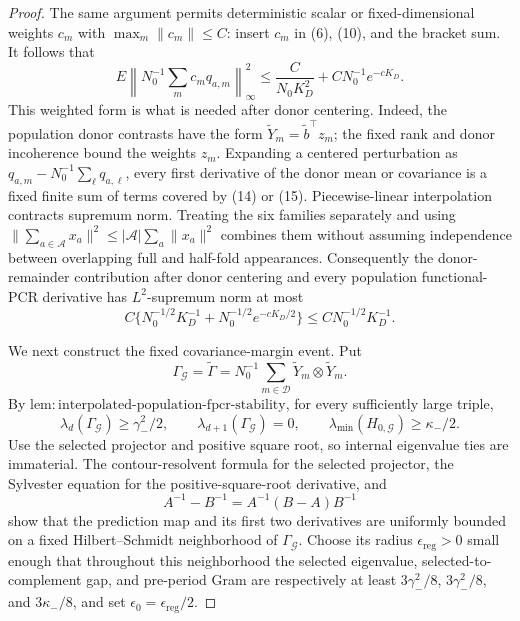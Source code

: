 \documentclass{article}
\begin{document}
\begin{proof}
The same argument permits deterministic scalar or fixed-dimensional weights
\(c_m\) with \(\max_m\|c_m\|\leq C\): insert \(c_m\) in (6), (10), and
the bracket sum.  It follows that
\[
 E\left\|N_0^{-1}\sum_m c_mq_{a,m}\right\|_\infty^2
 \leq\frac{C}{N_0K_D^2}+C N_0^{-1}e^{-cK_D}.           \tag{15}
\]
This weighted form is what is needed after donor centering.  Indeed, the
population donor contrasts have the form
\(\widetilde Y_m=\widetilde b^{\top}z_m\); the fixed rank and donor
incoherence bound the weights \(z_m\).  Expanding a centered perturbation as
\(q_{a,m}-N_0^{-1}\sum_\ell q_{a,\ell}\), every first derivative of the
donor mean or covariance is a fixed finite sum of terms covered by (14) or
(15).  Piecewise-linear interpolation contracts supremum norm.  Treating the
six families separately and using
\(\|\sum_{a\in\mathscr A}x_a\|^2\leq
|\mathscr A|\sum_a\|x_a\|^2\) combines them without assuming independence
between overlapping full and half-fold appearances.  Consequently the
donor-remainder contribution after donor centering and every population
functional-PCR derivative has \(L^2\)-supremum norm at most
\[
 C\{N_0^{-1/2}K_D^{-1}+N_0^{-1/2}e^{-cK_D/2}\}
 \leq C N_0^{-1/2}K_D^{-1}.                            \tag{16}
\]

We next construct the fixed covariance-margin event.  Put
\[
 \Gamma_{\mathcal G}=\widetilde\Gamma
 =N_0^{-1}\sum_{m\in\mathcal D}
   \widetilde Y_m\otimes\widetilde Y_m.
\]
By
\(\mathrm{lem:interpolated\mbox{-}population\mbox{-}fpcr\mbox{-}stability}\),
for every sufficiently large triple,
\[
 \lambda_d(\Gamma_{\mathcal G})\geq\gamma_-^2/2,
 \qquad \lambda_{d+1}(\Gamma_{\mathcal G})=0,
 \qquad \lambda_{\min}(H_{0,\mathcal G})\geq\kappa_-/2. \tag{17}
\]
Use the selected projector and positive square root, so internal eigenvalue
ties are immaterial.  The contour-resolvent formula for the selected
projector, the Sylvester equation for the positive-square-root derivative,
and
\[
 A^{-1}-B^{-1}=A^{-1}(B-A)B^{-1}                       \tag{18}
\]
show that the prediction map and its first two derivatives are uniformly
bounded on a fixed Hilbert--Schmidt neighborhood of
\(\Gamma_{\mathcal G}\).  Choose its radius
\(\epsilon_{\mathrm{reg}}>0\) small enough that throughout this neighborhood
the selected eigenvalue, selected-to-complement gap, and pre-period Gram are
respectively at least \(3\gamma_-^2/8\), \(3\gamma_-^2/8\), and
\(3\kappa_-/8\), and set \(\epsilon_0=\epsilon_{\mathrm{reg}}/2\).


\end{proof}
\end{document}
